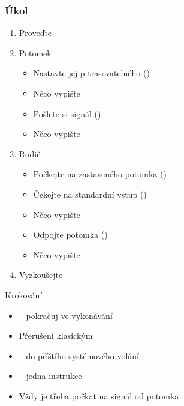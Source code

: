 \begin{frame}
  \frametitle{Úkol}

  \begin{enumerate}
    \item Proveďte 
    \item Potomek
    \begin{itemize}
      \item Nastavte jej p-trasovatelného ()
      \item Něco vypište
      \item Pošlete si signál ()
      \item Něco vypište
    \end{itemize}

    \item Rodič
    \begin{itemize}
      \item Počkejte na zastaveného potomka ()
      \item Čekejte na standardní vstup ()
      \item Něco vypište
      \item Odpojte potomka ()
      \item Něco vypište
    \end{itemize}
    \item Vyzkoušejte
  \end{enumerate}

\end{frame}

\begin{frame}{}{Krokování}

  \begin{itemize}
    \item {} -- pokračuj ve vykonávání
    \item Přerušení klasickým 

    \pause

    \item {} -- do příštího
      systémového volání
    \item {} -- jedna instrukce

    \pause

    \item Vždy je třeba počkat na signál od potomka
  \end{itemize}

\end{frame}

